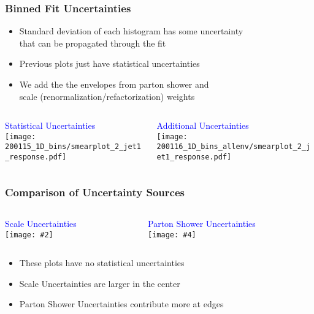 \documentclass{beamer}
\newcommand{\twofigs}[4]{
  \begin{columns}
    \begin{column}{0.5\linewidth}
      \centering
      \textcolor{blue}{#1} \\
      \texttt{[image: \#2]}
    \end{column}
    \begin{column}{0.5\linewidth}
      \centering
      \textcolor{blue}{#3} \\
      \texttt{[image: \#4]}
    \end{column}
  \end{columns}
}
\begin{document}
\begin{frame}
  \frametitle{Binned Fit Uncertainties}

  \begin{itemize}
  \item Standard deviation of each histogram has some uncertainty \\
    that can be propagated through the fit
  \item Previous plots just have statistical uncertainties
  \item We add the the envelopes from parton shower and \\
    scale (renormalization/refactorization) weights
  \end{itemize}

  \begin{columns}
    \begin{column}{0.5\linewidth}
      \centering
      \textcolor{blue}{Statistical Uncertainties} \\
      \texttt{[image: 200115\_1D\_bins/smearplot\_2\_jet1\_response.pdf]}
    \end{column}
    \begin{column}{0.5\linewidth}
      \centering
      \textcolor{blue}{Additional Uncertainties} \\
      \texttt{[image: 200116\_1D\_bins\_allenv/smearplot\_2\_jet1\_response.pdf]}
    \end{column}
  \end{columns}

\end{frame}


\begin{frame}
  \frametitle{Comparison of Uncertainty Sources}

  \vspace{8pt}

  \twofigs{Scale Uncertainties}
          {200116_1D_bins_scaleenv/smearplot_2_jet1_response.pdf}
          {Parton Shower Uncertainties}
          {200116_1D_bins_psenv/smearplot_2_jet1_response.pdf}

  \begin{itemize}
  \item These plots have no statistical uncertainties
  \item Scale Uncertainties are larger in the center
  \item Parton Shower Uncertainties contribute more at edges
  \end{itemize}

\end{frame}
\end{document}
